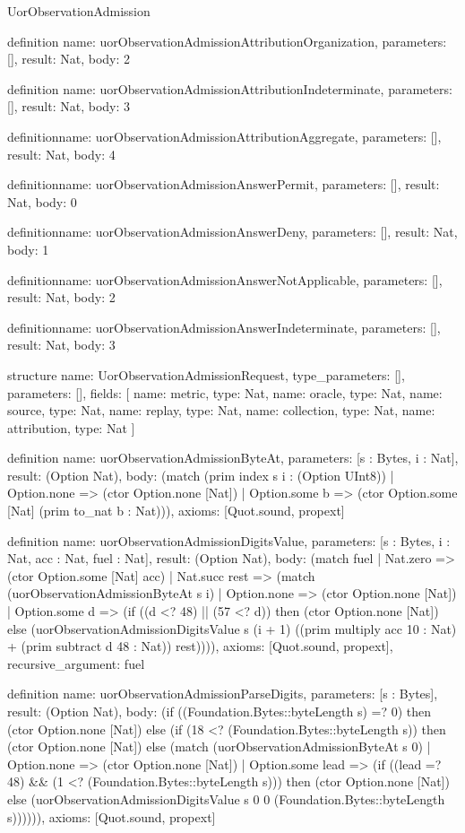 \begin{lexlean}{UorObservationAdmission}
\begin{semanticmodule}
definition{
  name: uorObservationAdmissionAttributionOrganization,
  parameters: [],
  result: Nat,
  body: 2
}

definition{
  name: uorObservationAdmissionAttributionIndeterminate,
  parameters: [],
  result: Nat,
  body: 3
}

definition{name: uorObservationAdmissionAttributionAggregate, parameters: [], result: Nat, body: 4}

definition{name: uorObservationAdmissionAnswerPermit, parameters: [], result: Nat, body: 0}

definition{name: uorObservationAdmissionAnswerDeny, parameters: [], result: Nat, body: 1}

definition{name: uorObservationAdmissionAnswerNotApplicable, parameters: [], result: Nat, body: 2}

definition{name: uorObservationAdmissionAnswerIndeterminate, parameters: [], result: Nat, body: 3}

structure{
  name: UorObservationAdmissionRequest,
  type_parameters: [],
  parameters: [],
  fields: [
    {name: metric, type: Nat},
    {name: oracle, type: Nat},
    {name: source, type: Nat},
    {name: replay, type: Nat},
    {name: collection, type: Nat},
    {name: attribution, type: Nat}
  ]
}

definition{
  name: uorObservationAdmissionByteAt,
  parameters: [s : Bytes, i : Nat],
  result: (Option Nat),
  body: (match (prim index s i : (Option UInt8))
    | Option.none => (ctor Option.none [Nat])
    | Option.some b => (ctor Option.some [Nat] (prim to_nat b : Nat))),
  axioms: [Quot.sound, propext]
}

definition{
  name: uorObservationAdmissionDigitsValue,
  parameters: [s : Bytes, i : Nat, acc : Nat, fuel : Nat],
  result: (Option Nat),
  body: (match fuel
    | Nat.zero => (ctor Option.some [Nat] acc)
    | Nat.succ rest => (match (uorObservationAdmissionByteAt s i)
      | Option.none => (ctor Option.none [Nat])
      | Option.some d => (if ((d <? 48) || (57 <? d)) then (ctor Option.none [Nat]) else (uorObservationAdmissionDigitsValue s (i + 1) ((prim multiply acc 10 : Nat) + (prim subtract d 48 : Nat)) rest)))),
  axioms: [Quot.sound, propext],
  recursive_argument: fuel
}

definition{
  name: uorObservationAdmissionParseDigits,
  parameters: [s : Bytes],
  result: (Option Nat),
  body: (if ((Foundation.Bytes::byteLength s) =? 0) then (ctor Option.none [Nat]) else (if (18 <? (Foundation.Bytes::byteLength s)) then (ctor Option.none [Nat]) else (match (uorObservationAdmissionByteAt s 0)
    | Option.none => (ctor Option.none [Nat])
    | Option.some lead => (if ((lead =? 48) && (1 <? (Foundation.Bytes::byteLength s))) then (ctor Option.none [Nat]) else (uorObservationAdmissionDigitsValue s 0 0 (Foundation.Bytes::byteLength s)))))),
  axioms: [Quot.sound, propext]
}


\end{semanticmodule}
\end{lexlean}
